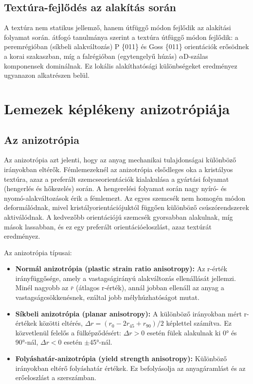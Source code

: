 \documentclass[12pt,a4paper,oneside]{report}
\begin{document}
\subsection{Textúra-fejlődés az alakítás során}
A textúra nem statikus jellemző, hanem útfüggő módon fejlődik az alakítási folyamat során. \cite{Engler2025} átfogó tanulmánya szerint a textúra útfüggő módon fejlődik: a peremrégióban (síkbeli alakváltozás) P \{011\}<111> és Goss \{011\}<100> orientációk erősödnek a korai szakaszban, míg a falrégióban (egytengelyű húzás) $\alpha$D-szálas komponensek dominálnak. Ez lokális alakíthatósági különbségeket eredményez ugyanazon alkatrészen belül.

\section{Lemezek képlékeny anizotrópiája}
\subsection{Az anizotrópia}
Az anizotrópia azt jelenti, hogy az anyag mechanikai tulajdonságai különböző irányokban eltérők. Fémlemezeknél az anizotrópia elsődleges oka a kristályos textúra, azaz a preferált szemcseorientációk kialakulása a gyártási folyamat (hengerlés és hőkezelés) során. A hengerelési folyamat során nagy nyíró- és nyomó-alakváltozások érik a fémlemezt. Az egyes szemcsék nem homogén módon deformálódnak, mivel kristályorientációjuktól függően különböző csúszórendszerek aktiválódnak. A kedvezőbb orientációjú szemcsék gyorsabban alakulnak, míg mások lassabban, és ez egy preferált orientációeloszlást, azaz textúrát eredményez.

Az anizotrópia típusai:
\begin{itemize}
    \item \textbf{Normál anizotrópia (plastic strain ratio anisotropy):} Az r-érték irányfüggősége, amely a vastagságirányú alakváltozás ellenállását jellemzi. Minél nagyobb az $\bar{r}$ (átlagos r-érték), annál jobban ellenáll az anyag a vastagságcsökkenésnek, ezáltal jobb mélyhúzhatóságot mutat.
    \item \textbf{Síkbeli anizotrópia (planar anisotropy):} A különböző irányokban mért r-értékek közötti eltérés, $\Delta r = (r_0 - 2r_{45} + r_{90})/2$ képlettel számítva. Ez közvetlenül felelős a fülképződésért: $\Delta r>0$ esetén fülek alakulnak ki 0° és 90°-nál, $\Delta r<0$ esetén $\pm$45°-nál.
    \item \textbf{Folyáshatár-anizotrópia (yield strength anisotropy):} Különböző irányokban eltérő folyáshatár értékek. Ez befolyásolja az anyagáramlást és az erőeloszlást a szerszámban.
\end{itemize}
\end{document}
